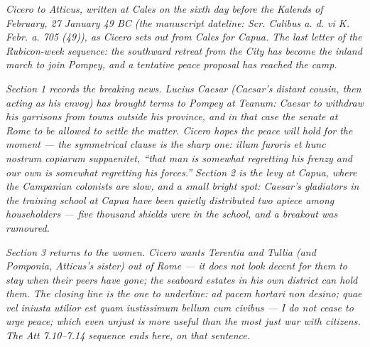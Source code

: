 
\textit{Cicero to Atticus, written at Cales on the sixth
day before the Kalends of February, 27 January 49 BC
(the manuscript dateline: \textit{Scr. Calibus a. d. vi
K. Febr. a. 705 (49)}), as Cicero sets out from Cales
for Capua. The last letter of the Rubicon-week sequence:
the southward retreat from the City has become the
inland march to join Pompey, and a tentative peace
proposal has reached the camp.}

\textit{Section 1 records the breaking news. Lucius
Caesar (Caesar's distant cousin, then acting as his
envoy) has brought terms to Pompey at Teanum: Caesar to
withdraw his garrisons from towns outside his province,
and in that case the senate at Rome to be allowed to
settle the matter. Cicero hopes the peace will hold for
the moment --- the symmetrical clause is the sharp one:
\emph{illum furoris et hunc nostrum copiarum suppaenitet},
``that man is somewhat regretting his frenzy and our own
is somewhat regretting his forces.'' Section 2 is the
levy at Capua, where the Campanian colonists are slow,
and a small bright spot: Caesar's gladiators in the
training school at Capua have been quietly distributed
two apiece among householders --- five thousand shields
were in the school, and a breakout was rumoured.}

\textit{Section 3 returns to the women. Cicero wants
Terentia and Tullia (and Pomponia, Atticus's sister)
out of Rome --- it does not look decent for them to
stay when their peers have gone; the seaboard estates
in his own district can hold them. The closing line is
the one to underline: \emph{ad pacem hortari non desino;
quae vel iniusta utilior est quam iustissimum bellum cum
civibus} --- I do not cease to urge peace; which even
unjust is more useful than the most just war with citizens.
The Att 7.10--7.14 sequence ends here, on that sentence.}
